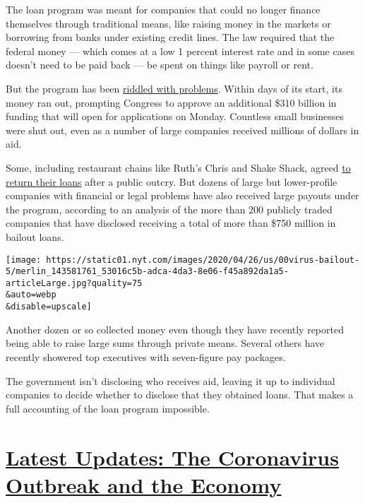 The loan program was meant for companies that could no longer finance
themselves through traditional means, like raising money in the markets
or borrowing from banks under existing credit lines. The law required
that the federal money --- which comes at a low 1 percent interest rate
and in some cases doesn't need to be paid back --- be spent on things
like payroll or rent.

But the program has been
\href{https://www.nytimes.com/2020/04/26/business/ppp-small-business-loans.html}{riddled
with problems}. Within days of its start, its money ran out, prompting
Congress to approve an additional \$310 billion in funding that will
open for applications on Monday. Countless small businesses were shut
out, even as a number of large companies received millions of dollars in
aid.

Some, including restaurant chains like Ruth's Chris and Shake Shack,
agreed
\href{https://www.nytimes.com/2020/04/20/business/shake-shack-returning-loan-ppp-coronavirus.html}{to
return their loans} after a public outcry. But dozens of large but
lower-profile companies with financial or legal problems have also
received large payouts under the program, according to an analysis of
the more than 200 publicly traded companies that have disclosed
receiving a total of more than \$750 million in bailout loans.

\texttt{[image: https://static01.nyt.com/images/2020/04/26/us/00virus-bailout-5/merlin\_143581761\_53016c5b-adca-4da3-8e06-f45a892da1a5-articleLarge.jpg?quality=75\\\&auto=webp\\\&disable=upscale]}

Another dozen or so collected money even though they have recently
reported being able to raise large sums through private means. Several
others have recently showered top executives with seven-figure pay
packages.

The government isn't disclosing who receives aid, leaving it up to
individual companies to decide whether to disclose that they obtained
loans. That makes a full accounting of the loan program impossible.

\hypertarget{latest-updates-the-coronavirus-outbreak-and-the-economy}{%
\section{\texorpdfstring{\href{https://www.nytimes.com/live/2020/08/17/business/stock-market-today-coronavirus?action=click\&pgtype=Article\&state=default\&region=MAIN_CONTENT_1\&context=storylines_live_updates}{Latest
Updates: The Coronavirus Outbreak and the
Economy}}{Latest Updates: The Coronavirus Outbreak and the Economy}}\label{latest-updates-the-coronavirus-outbreak-and-the-economy}}

